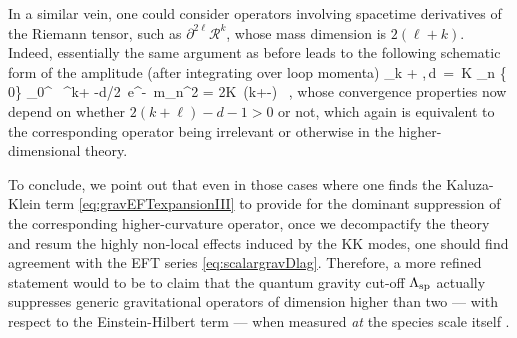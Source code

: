 In a similar vein, one could consider operators involving spacetime derivatives of the Riemann tensor, such as $\partial^{2\ell} \mathcal{R}^k$, whose mass dimension is $2(\ell+k)$. Indeed, essentially the same argument as before leads to the following schematic form of the amplitude (after integrating over loop momenta)
%
\beq
{}_{k + \ell,\,d}\, =\, \tilde K \sum_{n \in {} \setminus \{ 0\}} \int_{0}^{\infty} \dd\tau\, \tau^{k+ -d/2}\, e^{-\tau\, m_n^2} = 2\tilde K\, \Gamma\left(k+\ell-\right) \, ,
\label{eq:kgravscatteringwithlderivatives}
\eeq
%
whose convergence properties now depend on whether $2(k+\ell)-d-1 >0$ or not, which again is equivalent to the corresponding operator being irrelevant or otherwise in the higher-dimensional theory.

To conclude, we point out that even in those cases where one finds the Kaluza-Klein term \eqref{eq:gravEFTexpansionIII} to provide for the dominant suppression of the corresponding higher-curvature operator, once we decompactify the theory and resum the highly non-local effects induced by the KK modes, one should find agreement with the EFT series \eqref{eq:scalargravDlag}. Therefore, a more refined statement would to be to claim that the quantum gravity cut-off $\Lambda_{\text{sp}}$ actually suppresses generic gravitational operators of dimension higher than two --- with respect to the Einstein-Hilbert term --- when measured \emph{at} the species scale itself \cite{Wiesnerprivate}.


